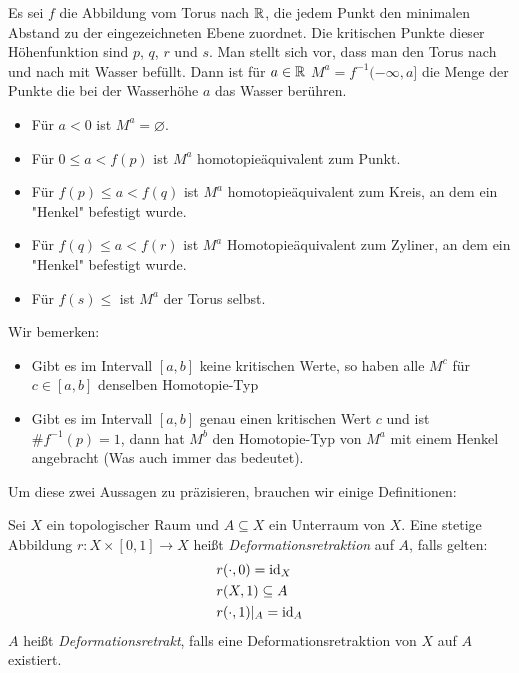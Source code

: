 Es sei $f$ die Abbildung vom Torus nach ${ \mathbb R }$, die jedem Punkt den minimalen
Abstand zu der eingezeichneten Ebene zuordnet. 
Die kritischen Punkte dieser Höhenfunktion sind $p$, $q$, $r$ und $s$.
Man stellt sich vor, dass man den Torus nach und nach mit Wasser befüllt. Dann 
ist für $a \in { \mathbb R }$ $M^a = f^{-1}(-\infty, a]$ die Menge der Punkte die bei der
Wasserhöhe $a$ das Wasser berühren. 

\begin{itemize}
    \item Für $a < 0$ ist $M^a = \varnothing$.
    \item Für $0 \leq a < f(p)$ ist $M^a$ homotopieäquivalent zum Punkt.
    \item Für $f(p) \leq a < f(q)$ ist $M^a$ homotopieäquivalent zum Kreis,
        an dem ein "Henkel" befestigt wurde.
    \item Für $f(q) \leq a < f(r)$ ist $M^a$ Homotopieäquivalent zum Zyliner,
        an dem ein "Henkel" befestigt wurde.
    \item Für $f(s) \leq$ ist $M^a$ der Torus selbst.
\end{itemize}

Wir bemerken: 
\begin{itemize}
    \item Gibt es im Intervall $[a, b]$ keine kritischen Werte, so haben alle
        $M^c$ für $c \in [a, b]$ denselben Homotopie-Typ
    \item Gibt es im Intervall $[a, b]$ genau einen kritischen Wert $c$ und ist
        $ \#f^{-1}(p) = 1$, dann hat $M^b$ den Homotopie-Typ von $M^a$ mit einem 
        Henkel angebracht (Was auch immer das bedeutet).
\end{itemize}

Um diese zwei Aussagen zu präzisieren, brauchen wir einige Definitionen:

\begin{definition}[Deformationsretrakt]
    Sei $X$ ein topologischer Raum und $A \subseteq X$ ein Unterraum von $X$.
    Eine stetige Abbildung $r: X \times [0, 1] \rightarrow X$ heißt 
    \textit{Deformationsretraktion} auf $A$, falls gelten:
    \begin{align*}
        & r(\cdot, 0) = { \operatorname{id} }_X \\
        & r(X, 1) \subseteq A \\
        & r(\cdot, 1)|_A = { \operatorname{id} }_A \\
    \end{align*}
    $A$ heißt \textit{Deformationsretrakt}, falls eine Deformationsretraktion
    von $X$ auf $A$ existiert.
\end{definition}

